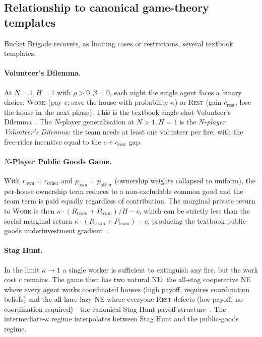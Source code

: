 \documentclass{anvil-paper}
\begin{document}
\subsection{Relationship to canonical game-theory templates}
\label{app:envspec:templates}

Bucket Brigade recovers, as limiting cases or restrictions, several
textbook templates.

\paragraph{Volunteer's Dilemma.}
At $N{=}1,H{=}1$ with $\rho>0,\beta{=}0$, each night the single agent
faces a binary choice: \textsc{Work} (pay $c$, save the house with
probability $\kappa$) or \textsc{Rest} (gain $c_{\text{rest}}$, lose the
house in the next phase). This is the textbook single-shot Volunteer's
Dilemma~\citep{diekmann1985volunteer}. The $N$-player generalisation
at $N>1,H=1$ is the
\emph{$N$-player Volunteer's Dilemma}: the team needs at least one
volunteer per fire, with the free-rider incentive equal to the
$c+c_{\text{rest}}$ gap.

\paragraph{$N$-Player Public Goods Game.}
With $r_{\text{own}}=r_{\text{other}}$ and $p_{\text{own}}=p_{\text{other}}$
(ownership weights collapsed to uniform), the per-house ownership term
reduces to a non-excludable common good and the team term is paid equally
regardless of contribution. The marginal private return to \textsc{Work}
is then $\kappa\cdot(R_{\text{team}}+P_{\text{team}})/H-c$, which can be
strictly less than the social marginal return $\kappa\cdot
(R_{\text{team}}+P_{\text{team}})-c$, producing the textbook
public-goods underinvestment gradient~\citep{ledyard1995public}.

\paragraph{Stag Hunt.}
In the limit $\kappa\to 1$ a single worker is sufficient to extinguish
any fire, but the work cost $c$ remains. The game then has two natural
NE: the all-stag cooperative NE where every agent works coordinated
houses (high payoff, requires coordination beliefs) and the all-hare
lazy NE where everyone \textsc{Rest}-defects (low payoff, no
coordination required)---the canonical Stag Hunt payoff
structure~\citep{skyrms2003stag}. The intermediate-$\kappa$ regime
interpolates between Stag Hunt and the public-goods regime.
\end{document}
